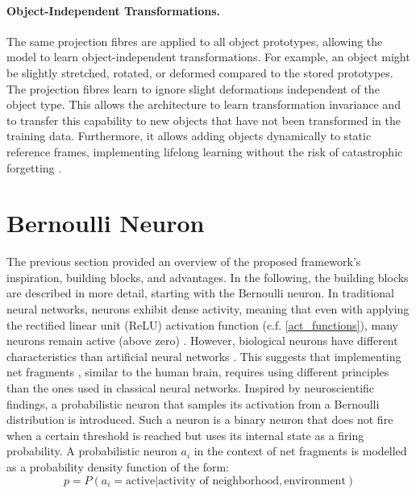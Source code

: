 \paragraph{Object-Independent Transformations.} The same projection fibres are applied to all object prototypes, allowing the model to learn object-independent transformations. For example, an object might be slightly stretched, rotated, or deformed compared to the stored prototypes. The projection fibres learn to ignore slight deformations independent of the object type. This allows the architecture to learn transformation invariance and to transfer this capability to new objects that have not been transformed in the training data.
Furthermore, it allows adding objects dynamically to static reference frames, implementing lifelong learning  without the risk of catastrophic forgetting .

\section{Bernoulli Neuron}
The previous section provided an overview of the proposed framework's inspiration, building blocks, and advantages. In the following, the building blocks are described in more detail, starting with the Bernoulli neuron.
In traditional neural networks, neurons exhibit dense activity, meaning that even with applying the rectified linear unit (ReLU) activation function (c.f. \eqref{act_functions}), many neurons remain active (above zero) . However, biological neurons have different characteristics than artificial neural networks .
This suggests that implementing net fragments , similar to the human brain, requires using different principles than the ones used in classical neural networks. Inspired by neuroscientific findings, a probabilistic neuron that samples its activation from a Bernoulli distribution is introduced.
Such a neuron is a binary neuron that does not fire when a certain threshold is reached but uses its internal state as a firing probability. A probabilistic neuron $a_i$ in the context of net fragments is modelled as a probability density function of the form:
\begin{equation}
    p = P(a_i = \text{active} | \text{activity of neighborhood}, \text{environment}) 
\end{equation}

